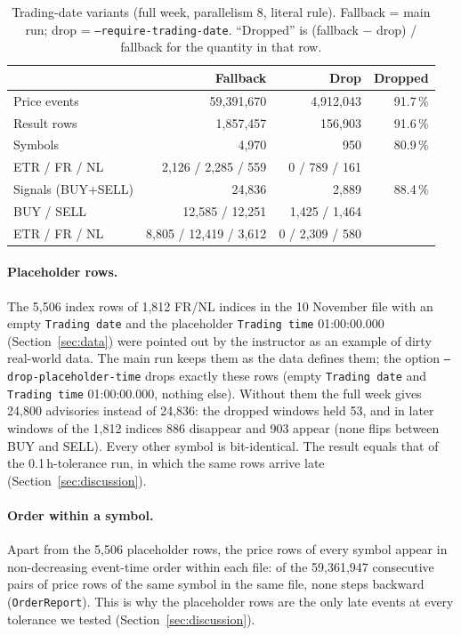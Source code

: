 \documentclass[sigconf,nonacm]{acmart}
\begin{document}
\begin{table}[t]
\caption{Trading-date variants (full week, parallelism 8, literal rule).
Fallback = main run; drop = \texttt{--require-trading-date}. ``Dropped'' is
(fallback $-$ drop) / fallback for the quantity in that row.}\label{tab:datevar}
\small
\begin{tabular}{lrrr}
\toprule
 & Fallback & Drop & Dropped \\
\midrule
Price events       & 59,391,670 & 4,912,043 & 91.7\,\% \\
Result rows        &  1,857,457 &   156,903 & 91.6\,\% \\
Symbols            &      4,970 &       950 & 80.9\,\% \\
\quad ETR / FR / NL & 2,126 / 2,285 / 559 & 0 / 789 / 161 & \\
Signals (BUY+SELL) &     24,836 &     2,889 & 88.4\,\% \\
\quad BUY / SELL    & 12,585 / 12,251 & 1,425 / 1,464 & \\
\quad ETR / FR / NL & 8,805 / 12,419 / 3,612 & 0 / 2,309 / 580 & \\
\bottomrule
\end{tabular}
\end{table}

\paragraph{Placeholder rows.} The 5,506 index rows of 1,812 FR/NL indices in
the 10 November file with an empty \texttt{Trading date} and the placeholder
\texttt{Trading time} 01:00:00.000 (Section~\ref{sec:data}) were pointed out by
the instructor as an example of dirty real-world data. The main run keeps them
as the data defines them; the option \texttt{--drop-placeholder-time} drops
exactly these rows (empty \texttt{Trading date} and \texttt{Trading time}
01:00:00.000, nothing else). Without them the full week gives 24,800
advisories instead of 24,836: the dropped windows held 53, and in later
windows of the 1,812 indices 886 disappear and 903 appear (none flips between
BUY and SELL). Every other symbol is bit-identical. The result equals that of
the 0.1\,h-tolerance run, in which the same rows arrive late
(Section~\ref{sec:discussion}).

\paragraph{Order within a symbol.} Apart from the 5,506 placeholder rows, the
price rows of every symbol appear in non-decreasing event-time order within
each file: of the 59,361,947 consecutive pairs of price rows of the same symbol
in the same file, none steps backward (\texttt{OrderReport}). This is why the
placeholder rows are the only late events at every tolerance we tested
(Section~\ref{sec:discussion}).
\end{document}
